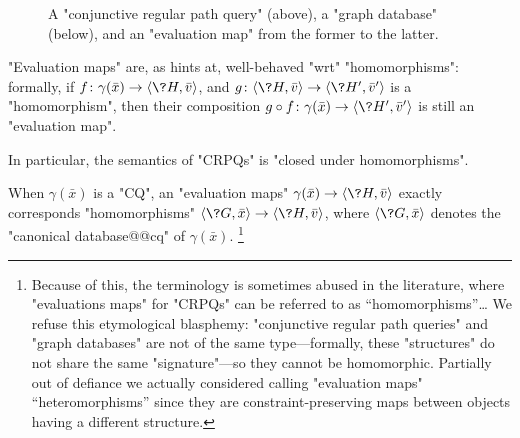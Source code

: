 \begin{figure}
    \centering
    \caption{\AP\label{fig:prelim-db-evaluation-map} A "conjunctive regular path query" (above), 
    a "graph database" (below), and an "evaluation map" from the former
    to the latter.}
\end{figure}
"Evaluation maps" are, as  hints at,
well-behaved "wrt" "homomorphisms": formally, if
$f\colon \gamma(\bar x) \to \tup{\?H, \bar v}$,
and $g\colon \tup{\?H, \bar v} \to \tup{\?H', \bar v'}$ is a "homomorphism",
then their composition $g\circ f\colon \gamma(\bar x) \to \tup{\?H', \bar v'}$ is still
an "evaluation map".%
\begin{fact}
    In particular, the semantics of "CRPQs" is
    "closed under homomorphisms".
\end{fact}
When $\gamma(\bar x)$ is a "CQ", an "evaluation maps" $\gamma(\bar x) \to \tup{\?H, \bar v}$
exactly corresponds "homomorphisms" $\tup{\?G, \bar x} \to \tup{\?H, \bar v}$,
where $\tup{\?G, \bar x}$ denotes the "canonical database@@cq" of $\gamma(\bar x)$.%
\footnote{Because of this, the terminology is sometimes abused in the literature, where "evaluations maps" 
for "CRPQs" can be referred to as ``homomorphisms''…
We refuse this etymological blasphemy: "conjunctive 
regular path queries" and "graph databases" are not of the same type---formally, these "structures" do not share the same "signature"---so they cannot be homomorphic.
Partially out of defiance we actually considered calling "evaluation maps" ``heteromorphisms'' since they are constraint-preserving maps between objects having a different structure.}

